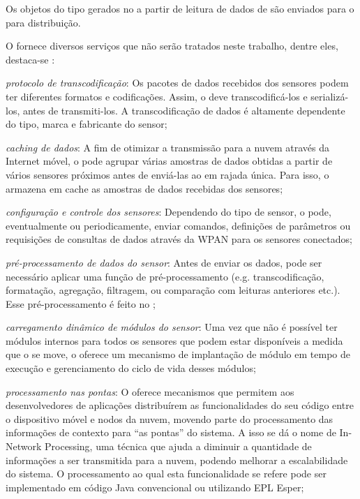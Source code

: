 Os objetos do tipo \sensordata gerados no \stwopa a partir de leitura de dados de \smartobjs são enviados para o \cddl para distribuição.

O \mhub fornece diversos serviços que não serão tratados neste trabalho, dentre eles, destaca-se \cite{gomes:2017}:

\begin{alineas}
	\item \emph{protocolo de transcodificação}:
		Os pacotes de dados recebidos dos sensores podem ter diferentes formatos e codificações.  Assim, o \mhub deve transcodificá-los e serializá-los, antes de transmiti-los. A transcodificação de dados é altamente dependente do tipo, marca e fabricante do sensor;
		
	\item \emph{caching de dados}:
		A fim de otimizar a transmissão para a nuvem através da Internet móvel, o \mhub pode agrupar várias amostras de dados obtidas a partir de vários sensores próximos antes de enviá-las ao \gateway em rajada única. Para isso, o \mhub armazena em cache as amostras de dados recebidas dos sensores;
		
	\item \emph{configuração e controle dos sensores}:
		Dependendo do tipo de sensor, o \mhub pode, eventualmente ou periodicamente, enviar comandos, definições de parâmetros ou requisições de consultas de dados através da WPAN para os sensores conectados;
		
	\item \emph{pré-processamento de dados do sensor}:
		Antes de enviar os dados, pode ser necessário aplicar uma função de pré-processamento (e.g.  transcodificação, formatação, agregação, filtragem, ou comparação com leituras anteriores etc.).  Esse pré-processamento é feito no \mhub;
		
	\item \emph{carregamento dinâmico de módulos do sensor}:
		Uma vez que não é possível ter módulos internos para todos os sensores que podem estar disponíveis a medida que o \gateway se move, o \mhub oferece um mecanismo de implantação de módulo em tempo de execução e gerenciamento do ciclo de vida desses módulos;
		
	\item \emph{processamento nas pontas}:
		O \mhub oferece mecanismos que permitem aos desenvolvedores de aplicações distribuírem as funcionalidades do seu código entre o dispositivo móvel e nodos da nuvem, movendo parte do processamento das informações de contexto para “as pontas” do sistema. A isso se dá o nome de In-Network Processing, uma técnica que ajuda a diminuir a quantidade de informações a ser transmitida para a nuvem, podendo melhorar a escalabilidade do sistema. O processamento ao qual esta funcionalidade se refere pode ser implementado em código Java convencional ou utilizando EPL Esper;
		

\end{alineas}
